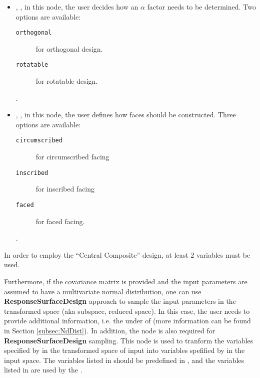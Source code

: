 \begin{itemize}
\begin{itemize}
\begin{itemize}
\begin{itemize}
        .
      \item {}, , in this node,
        the user decides how an $\alpha$ factor needs to be determined.
        Two options are available:
        \begin{description}
          \item[\texttt{orthogonal}] for orthogonal design.
          \item[\texttt{rotatable}] for rotatable design.
        \end{description}
        .
      \item {}, , in this node,
        the user defines how faces should be constructed.
        Three options are available:
        \begin{description}
          \item[\texttt{circumscribed}] for circumscribed facing
          \item[\texttt{inscribed}] for inscribed facing
          \item[\texttt{faced}] for faced facing.
        \end{description}
        .
     \end{itemize}
  \end{itemize}
  \nb In order to employ the ``Central Composite'' design, at least 2
  variables must be used.
\end{itemize}
\end{itemize}

Furthermore, if the covariance matrix is provided and the input parameters are assumed to have a multivariate normal distribution, one can use
\textbf{ResponseSurfaceDesign} approach to sample the input parameters in the transformed space (aka subspace, reduced space).
In this case, the user needs to provide additional information, i.e. the  under  of 
(more information can be found in Section \ref{subsec:NdDist}). In addition, the node  is also
required for \textbf{ResponseSurfaceDesign} sampling. This node is used to tranform the variables specified by  in the
transformed space of input into variables spefified by  in the input space. The variables listed
in  should be predefined in , and the variables listed in 
are used by the .

